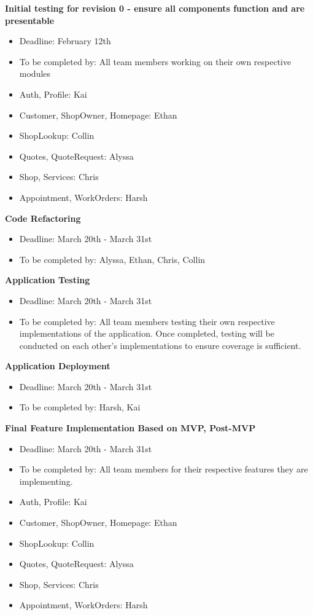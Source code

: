 \documentclass[12pt, titlepage]{article}
\begin{document}
\noindent \textbf{Initial testing for revision 0 - ensure all components function and are presentable}
\begin{itemize}
    \item Deadline: February 12th
    \item To be completed by: All team members working on their own respective modules
    \item Auth, Profile: Kai
    \item Customer, ShopOwner, Homepage: Ethan
    \item ShopLookup: Collin
    \item Quotes, QuoteRequest: Alyssa
    \item Shop, Services: Chris
    \item Appointment, WorkOrders: Harsh
\end{itemize}

\noindent \textbf{Code Refactoring}
\begin{itemize}
    \item Deadline: March 20th - March 31st
    \item To be completed by: Alyssa, Ethan, Chris, Collin
\end{itemize}

\noindent \textbf{Application Testing}
\begin{itemize}
    \item Deadline: March 20th - March 31st
    \item To be completed by: All team members testing their own respective implementations of the application. Once completed, testing will be conducted on each other's implementations to ensure coverage is sufficient.
\end{itemize}

\noindent \textbf{Application Deployment}
\begin{itemize}
    \item Deadline: March 20th - March 31st
    \item To be completed by: Harsh, Kai
\end{itemize}

\noindent \textbf{Final Feature Implementation Based on MVP, Post-MVP}
\begin{itemize}
    \item Deadline: March 20th - March 31st
    \item To be completed by: All team members for their respective features they are implementing.
    \item Auth, Profile: Kai
    \item Customer, ShopOwner, Homepage: Ethan
    \item ShopLookup: Collin
    \item Quotes, QuoteRequest: Alyssa
    \item Shop, Services: Chris
    \item Appointment, WorkOrders: Harsh
\end{itemize}
\end{document}
